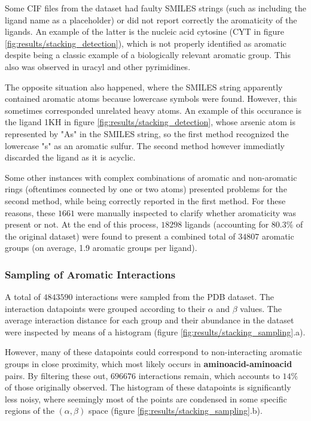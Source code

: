       Some CIF files from the dataset had faulty SMILES strings (such as including the ligand name as a placeholder) or did not report correctly the aromaticity of the ligands. An example of the latter is the nucleic acid cytosine (CYT in figure \ref{fig:results/stacking_detection}), which is not properly identified as aromatic despite being a classic example of a biologically relevant aromatic group. This also was observed in uracyl and other pyrimidines.

      The opposite situation also happened, where the SMILES string apparently contained aromatic atoms because lowercase symbols were found. However, this sometimes corresponded unrelated heavy atoms. An example of this occurance is the ligand 1KH in figure \ref{fig:results/stacking_detection}, whose arsenic atom is represented by "As" in the SMILES string, so the first method recognized the lowercase "s" as an aromatic sulfur. The second method however immediatly discarded the ligand as it is acyclic.

      Some other instances with complex combinations of aromatic and non-aromatic rings (oftentimes connected by one or two atoms) presented problems for the second method, while being correctly reported in the first method. For these reasons, these $1661$ were manually inspected to clarify whether aromaticity was present or not. At the end of this process, $18298$ ligands (accounting for $80.3 \% $ of the original dataset) were found to present a combined total of $34807$ aromatic groups (on average, 1.9 aromatic groups per ligand).

    \subsubsection{Sampling of Aromatic Interactions}
      A total of $4843590$ interactions were sampled from the PDB dataset. The interaction datapoints were grouped according to their $\alpha$ and $\beta$ values. The average interaction distance for each group and their abundance in the dataset were inspected by means of a histogram (figure \ref{fig:results/stacking_sampling}.a).

      However, many of these datapoints could correspond to non-interacting aromatic groups in close proximity, which most likely occurs in \textbf{aminoacid-aminoacid} pairs. By filtering these out, $696676$ interactions remain, which accounts to $14 \%$ of those originally observed. The histogram of these datapoints is significantly less noisy, where seemingly most of the points are condensed in some specific regions of the $(\alpha, \beta)$ space (figure \ref{fig:results/stacking_sampling}.b).

